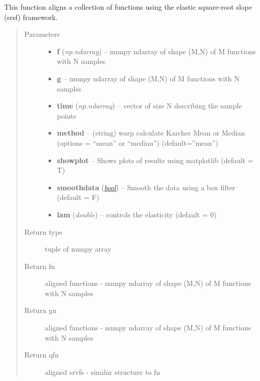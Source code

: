 \documentclass[letterpaper,10pt,english]{sphinxmanual}
\begin{document}
\begin{fulllineitems}
\label{time_warping:time_warping.srsf_align_pair}
This function aligns a collection of functions using the elastic square-root slope (srsf) framework.
\begin{quote}\begin{description}
\item[{Parameters}] \leavevmode\begin{itemize}
\item {} 
\textbf{f} (\emph{np.ndarray}) -- numpy ndarray of shape (M,N) of M functions with N samples

\item {} 
\textbf{g} -- numpy ndarray of shape (M,N) of M functions with N samples

\item {} 
\textbf{time} (\emph{np.ndarray}) -- vector of size N describing the sample points

\item {} 
\textbf{method} -- (string) warp calculate Karcher Mean or Median (options = ``mean'' or ``median'') (default=''mean'')

\item {} 
\textbf{showplot} -- Shows plots of results using matplotlib (default = T)

\item {} 
\textbf{smoothdata} (\href{http://docs.python.org/library/functions.html\#bool}{\emph{bool}}) -- Smooth the data using a box filter (default = F)

\item {} 
\textbf{lam} (\emph{double}) -- controls the elasticity (default = 0)

\end{itemize}

\item[{Return type}] \leavevmode
tuple of numpy array

\item[{Return fn}] \leavevmode
aligned functions - numpy ndarray of shape (M,N) of M functions with N samples

\item[{Return gn}] \leavevmode
aligned functions - numpy ndarray of shape (M,N) of M functions with N samples

\item[{Return qfn}] \leavevmode
aligned srvfs - similar structure to fn


\end{description}
\end{quote}
\end{fulllineitems}
\end{document}
